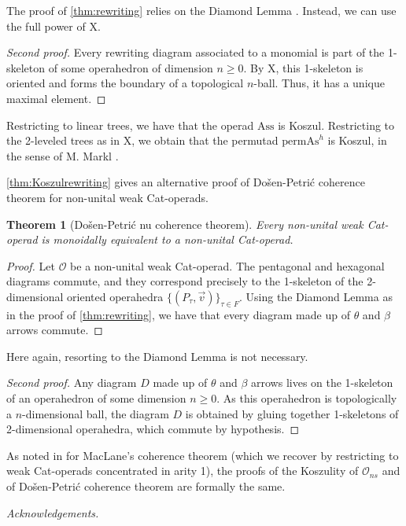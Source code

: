 \documentclass[10pt]{amsart}
\newtheorem{thm}{Theorem}[section]
\theoremstyle{definition}
\theoremstyle{remark}
\numberwithin{equation}{section}
\newcommand{\0}{\color{blue}{\mathsf{0}}}
\begin{document}
The proof of \cref{thm:rewriting} relies on the Diamond Lemma \cite[Theorem 8.5.5]{LodayVallette12}. Instead, we can use the full power of X.

\begin{proof}[Second proof] Every rewriting diagram associated to a monomial is part of the 1-skeleton of some operahedron of dimension $n\geq 0$. By X, this 1-skeleton is oriented and forms the boundary of a topological $n$-ball. Thus, it has a unique maximal element. 
\end{proof}

Restricting to linear trees, we have that the operad $\mathrm{Ass}$ is Koszul. Restricting to the 2-leveled trees as in X, we obtain that the permutad $\mathrm{permAs}^h$ is Koszul, in the sense of M. Markl \cite[Definition 21]{Markl19}.

\medskip

\cref{thm:Koszulrewriting} gives an alternative proof of Do\v sen-Petri\'c coherence theorem for non-unital weak Cat-operads. 

\begin{thm}[Do\v sen-Petri\'c nu coherence theorem] Every non-unital weak Cat-operad is monoidally equivalent to a non-unital Cat-operad.
\end{thm}

\begin{proof} Let $\mathcal{O}$ be a non-unital weak Cat-operad. The pentagonal and hexagonal diagrams commute, and they correspond precisely to the 1-skeleton of the 2-dimensional oriented operahedra $\{(P_\tau,\vec v)\}_{\tau \in F}$. Using the Diamond Lemma as in the proof of \cref{thm:rewriting}, we have that every diagram made up of $\theta$ and $\beta$ arrows commute. 
\end{proof}

Here again, resorting to the Diamond Lemma is not necessary.

\begin{proof}[Second proof] Any diagram $D$ made up of $\theta$ and $\beta$ arrows lives on the 1-skeleton of an operahedron of some dimension $n\geq 0$. As this operahedron is topologically a $n$-dimensional ball, the diagram $D$ is obtained by gluing together 1-skeletons of 2-dimensional operahedra, which commute by hypothesis.
\end{proof}

As noted in \cite[Remark p.266]{LodayVallette12} for MacLane's coherence theorem (which we recover by restricting to weak Cat-operads concentrated in arity 1), the proofs of the Koszulity of $\mathcal{O}_{ns}$ and of Do\v sen-Petri\'c coherence theorem are formally the same. 


  
  

\emph{Acknowledgements.}    





\end{document}
